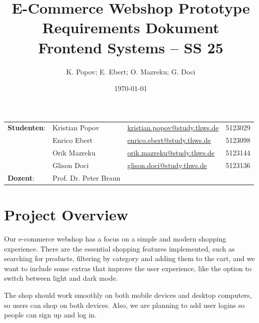 \documentclass[12pt]{article}
\title{
		{\LARGE \textbf{E-Commerce Webshop Prototype
	Requirements Dokument}}\\[5ex]
	{\large Frontend Systems – SS 25}\\[5ex]
}
\author{K. Popov; E. Ebert; O. Mazreku; G. Doci}
\date{\today}
\begin{document}
	\maketitle
	\noindent\begin{tabular}{@{}lllr}
				 \textbf{Studenten}:
				 & Kristian Popov         &\href{mailto:kristian.popov@study.thws.de}{kristian.popov@study.thws.de}           & 5123029
				 \\[2ex]& Enrico Ebert     &\href{mailto:enrico.ebert@study.thws.de}{enrico.ebert@study.thws.de} 			  & 5123098
				 \\[2ex]& Orik Mazreku        &\href{mailto:orik.mazreku@study.thws.de}{orik.mazreku@study.thws.de}           & 5123144
				 \\[2ex]& Glison Doci        &\href{mailto:glison.doci@study.thws.de}{glison.doci@study.thws.de}              & 5123136
				 \\[4ex]\textbf{Dozent}:      & Prof. Dr. Peter Braun
	\end{tabular}
	\newpage

	\tableofcontents
	\newpage


\maketitle
\newpage
\section{Project Overview}\label{sec:project-overview}

Our e-commerce webshop has a focus on a simple and modern shopping experience.
There are the essential shopping features implemented, such as searching for products, filtering by category and adding them to the cart, and we want to include some extras that improve the user experience, like the option to switch between light and dark mode.

The shop should work smoothly on both mobile devices and desktop computers, so users can shop on both devices.
Also, we are planning to add user logins so people can sign up and log in.
\end{document}
